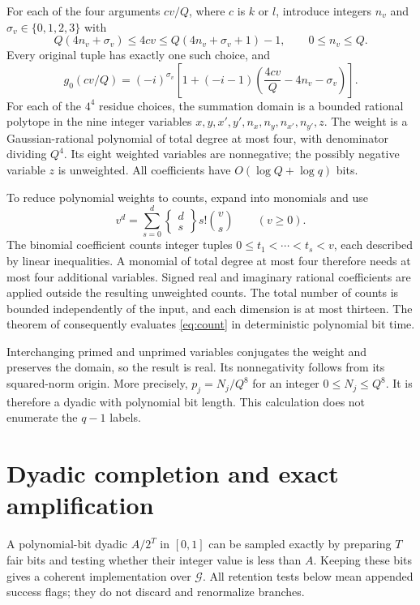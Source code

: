 \documentclass[11pt,reqno]{amsart}
\numberwithin{equation}{section}
\theoremstyle{definition}
\theoremstyle{remark}
\begin{document}
For each of the four arguments $cv/Q$, where $c$ is $k$ or $l$,
introduce integers $n_v$ and $\sigma_v\in\{0,1,2,3\}$ with
\begin{equation}\label{eq:cell}
 Q(4n_v+\sigma_v)\le4cv
 \le Q(4n_v+\sigma_v+1)-1,\qquad 0\le n_v\le Q.
\end{equation}
Every original tuple has exactly one such choice, and
\[
 g_0(cv/Q)=(-i)^{\sigma_v}
 \left[1+(-i-1)\left(\frac{4cv}{Q}-4n_v-\sigma_v\right)\right].
\]
For each of the $4^4$ residue choices, the summation domain is a bounded
rational polytope in the nine integer variables
$x,y,x',y',n_x,n_y,n_{x'},n_{y'},z$.
The weight is a Gaussian-rational polynomial of total degree at most
four, with denominator dividing $Q^4$. Its eight weighted variables
are nonnegative; the possibly negative variable $z$ is unweighted.
All coefficients have $O(\log Q+\log q)$ bits.

To reduce polynomial weights to counts, expand into monomials and use
\[
 v^d=\sum_{s=0}^d\left\{\begin{matrix}d\\s\end{matrix}\right\}
 s!\binom vs\qquad(v\ge0).
\]
The binomial coefficient counts integer tuples
$0\le t_1<\cdots<t_s<v$, each described by linear inequalities.
A monomial of total degree at most four therefore needs at most four
additional variables. Signed real and imaginary rational coefficients
are applied outside the resulting unweighted counts. The total number
of counts is bounded independently of the input, and each dimension is
at most thirteen. The theorem of \cite{BP} consequently evaluates
\eqref{eq:count} in deterministic polynomial bit time.

Interchanging primed and unprimed variables conjugates the weight and
preserves the domain, so the result is real. Its nonnegativity follows
from its squared-norm origin. More precisely, $p_j=N_j/Q^8$ for an
integer $0\le N_j\le Q^8$. It is therefore a dyadic with polynomial
bit length. This calculation does not enumerate the $q-1$ labels.

\section{Dyadic completion and exact amplification}
A polynomial-bit dyadic $A/2^T$ in $[0,1]$ can be sampled exactly by
preparing $T$ fair bits and testing whether their integer value is less
than $A$. Keeping these bits gives a coherent implementation over
$\mathcal G$. All retention tests below mean appended success flags;
they do not discard and renormalize branches.
\end{document}

